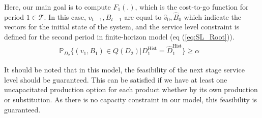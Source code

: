 \documentclass[10pt]{article}
\newcommand{\ti}{t} %
\newcommand{\TI}{\mathcal{T}}
\newcommand{\ka}{k} %
\newcommand{\KA}{\mathcal{K}}
\newcommand{\Ka}{K}
\newcommand{\jey}{j} %
\newcommand{\Graf}{\mathcal{A}} %
\newcommand{\Bi}{B} %
\newcommand{\Vi}{v} %
\newcommand{\Es}{S} %
\newcommand{\x}{x} %
\newcommand{\y}{y} %
\newcommand{\Csub}{\mathcal{K}^+_k}
\newcommand{\Psub}{\mathcal{K}^-_k}
\newcommand{\tAct}{\hat{\ti}} %
\begin{document}
Here, our main goal is to compute $F_{1}(.)$, which is the cost-to-go function for period $1 \in \TI$. In this case, $\Vi_{t-1}, \Bi_{t-1}$ are equal to $\hat{\Vi}_{0},\hat{\Bi}_{0}$ which indicate the vectors for the initial state of the system, and the service level constraint is defined for the second period in finite-horizon model (eq (\ref{eq:SL_Root})).
\begin{align}
& \mathbb{P}_{D_2}\{ ({\Vi}_{1}, {\Bi}_{1} ) \in Q(D_2 )| D^\text{Hist}_{1} = \hat{D}^\text{Hist}_{1} \} \geq \alpha& \label{eq:SL_Root}
&
\end{align}


It should be noted that in this model, the feasibility of the next stage service level should be guaranteed. This can be satisfied if we have at least one uncapacitated production option for each product whether by its own production or substitution. As there is no capacity constraint in our model, this feasibility is guaranteed.
\end{document}
